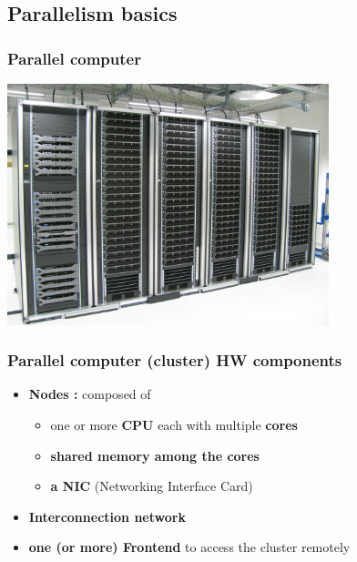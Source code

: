 %
%
\subsection{Parallelism basics}


\begin{frame}[containsverbatim]
\frametitle{Parallel computer}
\begin{center}
        {\includegraphics[height=7cm]{Day0/images/bellatrix2.jpg}}
\end{center}
\end{frame}

\begin{frame}[containsverbatim]
\frametitle{Parallel computer (cluster) HW components}
\begin{itemize}
	\item{\textbf{Nodes :} composed of
		\begin{itemize}
			\item{one or more \textbf{CPU} each with multiple \textbf{cores}}
			\item{\textbf{shared memory among the cores}}
			\item{\textbf{a NIC} (Networking Interface Card)}
		\end{itemize}
	}
	\item{\textbf{Interconnection network}}
	\item{\textbf{one (or more) Frontend} to access the cluster remotely}
\end{itemize}
\end{frame}

